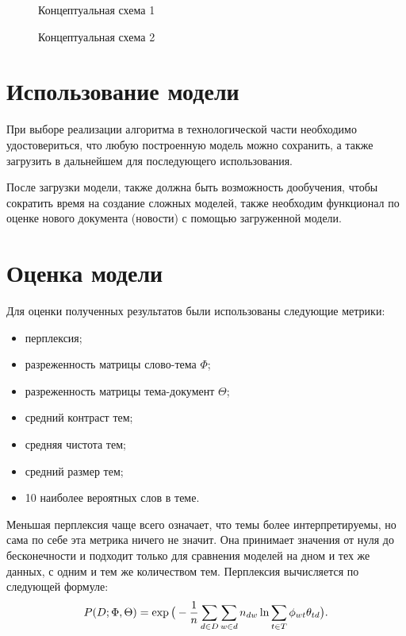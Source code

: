 \begin{figure}[h]
    \caption{Концептуальная схема 1}
    \label{fig:IDEF0_1}
\end{figure}

\begin{figure}[h]
    \caption{Концептуальная схема 2}
    \label{fig:IDEF0_2}
\end{figure}
    
%
\section{Использование модели}

При выборе реализации алгоритма в технологической части необходимо удостовериться, что любую построенную модель можно сохранить, а также загрузить в дальнейшем для последующего использования.

После загрузки модели, также должна быть возможность дообучения, чтобы сократить время на создание сложных моделей, также необходим функционал по оценке нового документа (новости) с помощью загруженной модели.
%
\section{Оценка модели}

Для оценки полученных результатов были использованы следующие метрики:

\begin{itemize}
    \item перплексия;
    \item разреженность матрицы слово-тема $\Phi$;
    \item разреженность матрицы тема-документ $\Theta$;
    \item средний контраст тем;
    \item средняя чистота тем;
    \item средний размер тем;
    \item 10 наиболее вероятных слов в теме.
\end{itemize}

Меньшая перплексия чаще всего означает, что темы более интерпретируемы, но сама по себе эта метрика ничего не значит. Она принимает значения от нуля до бесконечности и подходит только для сравнения моделей на дном и тех же данных, с одним и тем же количеством тем. Перплексия вычисляется по следующей формуле:
\begin{equation}
P(D;\Phi,\Theta) = \exp{\big( 
    -{{1}\over{n}} \sum_{d \in D}{
        \sum_{w \in d}{
            n_{dw} \ln{
                \sum_{t \in T}{
                    \phi_{wt} \theta_{td}
                }
            }
        }
    } 
\big)}.
\end{equation}

